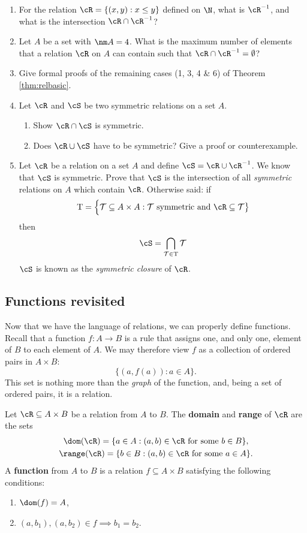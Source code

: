 \begin{enumerate}
  \item For the relation $\cR=\{(x,y):x\le y\}$ defined on $\N$, what is $\cR^{-1}$, and what is the intersection $\cR\cap\cR^{-1}$?

  \item Let $A$ be a set with $\nm A=4$. What is the maximum number of elements that a relation $\cR$ on $A$ can contain such that $\cR\cap \cR^{-1}=\emptyset$?
  
  \item Give formal proofs of the remaining cases (1, 3, 4 \& 6) of Theorem \ref{thm:relbasic}.
  
  \item Let $\cR$ and $\cS$ be two symmetric relations on a set $A$. 
\begin{enumerate}
    \item Show $\cR \cap \cS$ is symmetric.
    \item Does $\cR \cup \cS$ have to be symmetric? Give a proof or counterexample.
\end{enumerate}
  
  \item Let $\cR$ be a relation on a set $A$ and define $\cS=\cR\cup\cR^{-1}$. We know that $\cS$ is symmetric. Prove that $\cS$ is the intersection of all \emph{symmetric} relations on $A$ which contain $\cR$. Otherwise said: if
  \[\mathrm T=\Bigl\{\mathcal T\subseteq A\times A:\mathcal T\text{ symmetric and }\cR\subseteq\mathcal T\bigr\}\]
  then
  \[\cS=\bigcap\limits_{\mathcal T\in \mathrm T} \mathcal T\]
  $\cS$ is known as the \emph{symmetric closure} of $\cR$.
\end{enumerate}
\newpage


\subsection{Functions revisited}\label{sec:func2}

Now that we have the language of relations, we can properly define functions. Recall that a function $f:A\to B$ is a rule that assigns one, and only one, element of $B$ to each element of $A$. We may therefore view $f$ as a collection of ordered pairs in $A\times B$:
\[\big\{(a,f(a)):a\in A\big\}.\]
This set is nothing more than the \emph{graph} of the function, and, being a set of ordered pairs, it is a relation.

\begin{defn}\label{defn:func}
Let $\cR\subseteq A\times B$ be a relation from $A$ to $B$. The \textbf{domain} and \textbf{range} of $\cR$ are the sets
\begin{gather*}
\dom(\cR)=\{a\in A:(a,b)\in \cR\text{ for some }b\in B\},\\
\range(\cR)=\{b\in B:(a,b)\in \cR\text{ for some }a\in A\}.
\end{gather*}
A \textbf{function} from $A$ to $B$ is a relation $f\subseteq A\times B$ satisfying the following conditions:
\begin{enumerate}
  \item $\dom(f)=A$,
  \item $(a,b_1),(a,b_2)\in f\implies b_1=b_2$.
\end{enumerate}
\end{defn}

